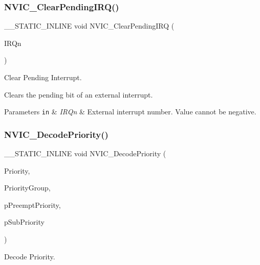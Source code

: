 \subsubsection{\texorpdfstring{N\+V\+I\+C\+\_\+\+Clear\+Pending\+I\+R\+Q()}{NVIC\_ClearPendingIRQ()}}
{\footnotesize\ttfamily \+\_\+\+\_\+\+S\+T\+A\+T\+I\+C\+\_\+\+I\+N\+L\+I\+NE void N\+V\+I\+C\+\_\+\+Clear\+Pending\+I\+RQ (\begin{DoxyParamCaption}\item[{\mbox{\hyperlink{group___peripheral__interrupt__number__definition_ga7e1129cd8a196f4284d41db3e82ad5c8}{I\+R\+Qn\+\_\+\+Type}}}]{I\+R\+Qn }\end{DoxyParamCaption})}



Clear Pending Interrupt. 

Clears the pending bit of an external interrupt. 
\begin{DoxyParams}[1]{Parameters}
\mbox{\tt in}  & {\em I\+R\+Qn} & External interrupt number. Value cannot be negative. \\
\hline
\end{DoxyParams}
\mbox{\label{group___c_m_s_i_s___core___n_v_i_c_functions_ga3387607fd8a1a32cccd77d2ac672dd96}} 
\subsubsection{\texorpdfstring{N\+V\+I\+C\+\_\+\+Decode\+Priority()}{NVIC\_DecodePriority()}}
{\footnotesize\ttfamily \+\_\+\+\_\+\+S\+T\+A\+T\+I\+C\+\_\+\+I\+N\+L\+I\+NE void N\+V\+I\+C\+\_\+\+Decode\+Priority (\begin{DoxyParamCaption}\item[{uint32\+\_\+t}]{Priority,  }\item[{uint32\+\_\+t}]{Priority\+Group,  }\item[{uint32\+\_\+t $\ast$const}]{p\+Preempt\+Priority,  }\item[{uint32\+\_\+t $\ast$const}]{p\+Sub\+Priority }\end{DoxyParamCaption})}



Decode Priority. 


